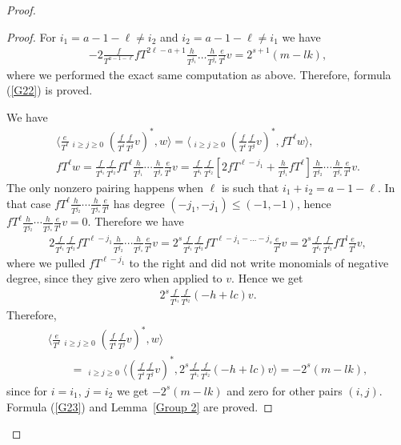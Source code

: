 \documentclass[pdftex]{sigma}
\numberwithin{equation}{section}
\begin{document}
\begin{proof}
\begin{proof}
For $i_1 = a-1-\ell \ne i_2$ and $i_2 = a-1-\ell \ne i_1$ we have
\begin{gather*}
- 2 \frac{f}{T^{a-1-\ell}} fT^{2\ell-a+1} \frac{h}{T^{j_1}} \dots \frac{h}{T^{j_s}} \frac{e}{T^l} v = 2^{s+1} (m - lk),
\end{gather*}
where we performed the exact same computation as above. Therefore, formula (\ref{G22}) is proved.

We have
\begin{gather*}
 \bigg\langle \frac{e}{T^{\ell}} \mathop{\sum_{i+j=a-1-\ell}}_{i\geq j\geq 0} \left(\frac{f}{T^i}\frac{f}{T^j}v\right)^*, w \bigg\rangle = \bigg\langle \mathop{\sum_{i+j=a-1-\ell}}_{i\geq j\geq 0} \left(\frac{f}{T^i}\frac{f}{T^j}v\right)^*, fT^{\ell} w \bigg\rangle, \\
fT^{\ell} w = \frac{f}{T^{i_1}}\frac{f}{T^{i_2}} fT^{\ell} \frac{h}{T^{j_1}} \cdots \frac{h}{T^{j_s}} \frac{e}{T^l} v = \frac{f}{T^{i_1}}\frac{f}{T^{i_2}} \left[ 2 fT^{\ell-j_1} +\frac{h}{T^{j_1}} fT^\ell \right] \frac{h}{T^{j_2}} \cdots \frac{h}{T^{j_s}} \frac{e}{T^l} v.
\end{gather*}
The only nonzero pairing happens when $\ell$ is such that $i_1+i_2 = a-1-\ell$. In that case $fT^{\ell} \frac{h}{T^{j_2}} \cdots \frac{h}{T^{j_s}} \frac{e}{T^l}$ has degree $(-j_1, -j_1) \leq (-1,-1)$, hence $fT^{\ell} \frac{h}{T^{j_2}} \cdots \frac{h}{T^{j_s}} \frac{e}{T^l}v=0$. Therefore we have
\begin{gather*}
2 \frac{f}{T^{i_1}}\frac{f}{T^{i_2}} fT^{\ell-j_1} \frac{h}{T^{j_2}} \cdots \frac{h}{T^{j_s}} \frac{e}{T^l} v = 2^s \frac{f}{T^{i_1}}\frac{f}{T^{i_2}} fT^{\ell-j_1 - \dots - j_s} \frac{e}{T^l} v = 2^s \frac{f}{T^{i_1}}\frac{f}{T^{i_2}} fT^{l} \frac{e}{T^l} v,
\end{gather*}
where we pulled $fT^{\ell-j_1}$ to the right and did not write monomials of negative degree, since they give zero when applied to $v$. Hence we get
\begin{gather*}
2^s \frac{f}{T^{i_1}}\frac{f}{T^{i_2}} (-h +lc) v.
\end{gather*}
Therefore,
\begin{gather*}
\bigg\langle \frac{e}{T^{\ell}} \mathop{\sum_{i+j=a-1-\ell}}_{i\geq j\geq 0} \left(\frac{f}{T^i}\frac{f}{T^j}v\right)^*, w \bigg\rangle \\
\qquad{} = \mathop{\sum_{i+j=a-1-\ell}}_{i\geq j\geq 0}\bigg\langle \left(\frac{f}{T^i}\frac{f}{T^j}v\right)^*, 2^s \frac{f}{T^{i_1}}\frac{f}{T^{i_2}} (-h +lc) v \bigg\rangle = - 2^{s} (m - lk),
\end{gather*}
since for $i = i_1$, $j = i_2$ we get $-2^s (m - lk)$ and zero for other pairs $(i,j)$. Formula (\ref{G23}) and Lemma~\ref{Group 2} are proved.
\end{proof}


\end{proof}
\end{document}
